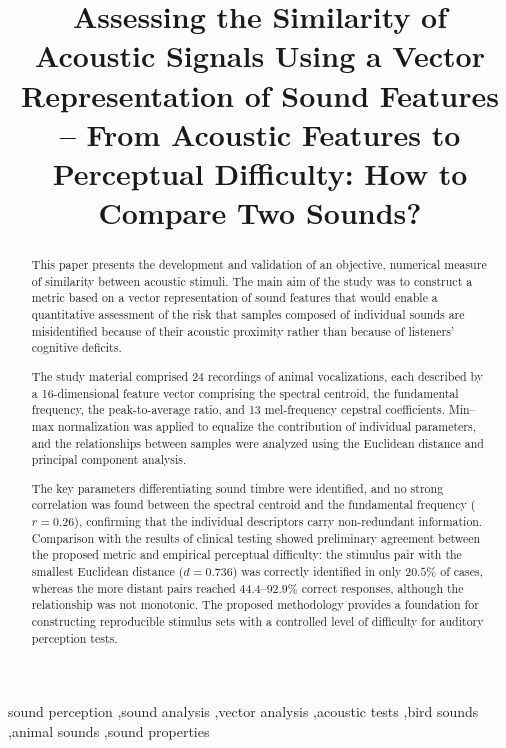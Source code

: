 \documentclass[doubleblind,preprint,12pt]{elsarticle}
\begin{document}
\begin{frontmatter}

\title{Assessing the Similarity of Acoustic Signals Using a Vector Representation of Sound Features\\
-- From Acoustic Features to Perceptual Difficulty: How to Compare Two Sounds?}

\begin{abstract}

This paper presents the development and validation of an objective, numerical measure of similarity between acoustic stimuli. The main aim of the study was to construct a metric based on a vector representation of sound features that would enable a quantitative assessment of the risk that samples composed of individual sounds are misidentified because of their acoustic proximity rather than because of listeners' cognitive deficits.

The study material comprised 24 recordings of animal vocalizations, each described by a 16-dimensional feature vector comprising the spectral centroid, the fundamental frequency, the peak-to-average ratio, and 13 mel-frequency cepstral coefficients. Min--max normalization was applied to equalize the contribution of individual parameters, and the relationships between samples were analyzed using the Euclidean distance and principal component analysis.

The key parameters differentiating sound timbre were identified, and no strong correlation was found between the spectral centroid and the fundamental frequency ($r = 0.26$), confirming that the individual descriptors carry non-redundant information. Comparison with the results of clinical testing showed preliminary agreement between the proposed metric and empirical perceptual difficulty: the stimulus pair with the smallest Euclidean distance ($d = 0.736$) was correctly identified in only $20.5\%$ of cases, whereas the more distant pairs reached $44.4$--$92.9\%$ correct responses, although the relationship was not monotonic. The proposed methodology provides a foundation for constructing reproducible stimulus sets with a controlled level of difficulty for auditory perception tests.

\end{abstract}

\begin{keyword}
sound perception \sep sound analysis \sep vector analysis \sep acoustic tests \sep bird sounds \sep animal sounds \sep sound properties
\end{keyword}

\end{frontmatter}
\end{document}
